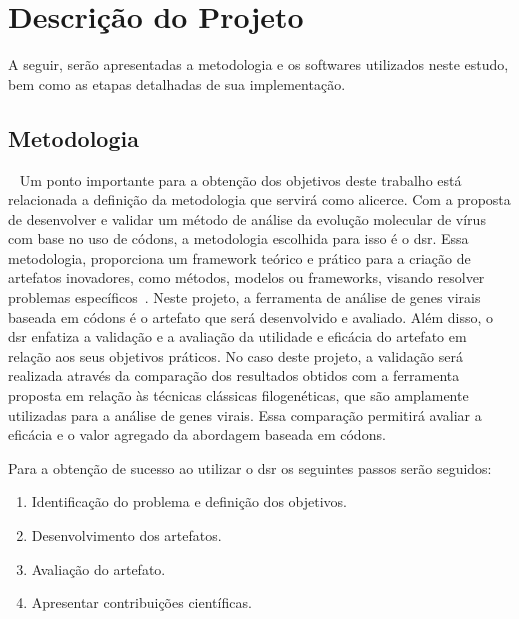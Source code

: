 
\chapter{Descrição do Projeto}




A seguir, serão apresentadas a metodologia e os softwares utilizados neste estudo, bem como as etapas detalhadas de sua implementação.

\section{Metodologia}~\label{sec:metodologia}
Um ponto importante para a obtenção dos objetivos deste trabalho está relacionada a definição da metodologia que servirá como alicerce. Com a proposta de desenvolver e validar um método de análise da evolução molecular de vírus com base no uso de códons, a metodologia escolhida para isso é o \gls{dsr}. Essa metodologia, proporciona um framework teórico e prático para a criação de artefatos inovadores, como métodos, modelos ou frameworks, visando resolver problemas específicos~\cite{peffers_dsr_2007}. Neste projeto, a ferramenta de análise de genes virais baseada em códons é o artefato que será desenvolvido e avaliado. Além disso, o \gls{dsr} enfatiza a validação e a avaliação da utilidade e eficácia do artefato em relação aos seus objetivos práticos. No caso deste projeto, a validação será realizada através da comparação dos resultados obtidos com a ferramenta proposta em relação às técnicas clássicas filogenéticas, que são amplamente utilizadas para a análise de genes virais. Essa comparação permitirá avaliar a eficácia e o valor agregado da abordagem baseada em códons.

Para a obtenção de sucesso ao utilizar o \gls{dsr} os seguintes passos serão seguidos:
\begin{enumerate}
  \item Identificação do problema e definição dos objetivos.
  \item Desenvolvimento dos artefatos.
  \item Avaliação do artefato.
  \item Apresentar contribuições científicas.
\end{enumerate}

